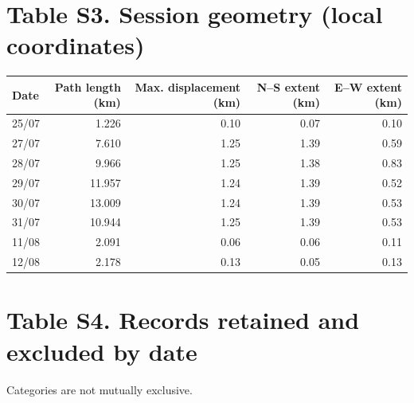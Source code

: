 \documentclass[10pt,a4paper]{article}
\begin{document}
\section*{Table S3. Session geometry (local coordinates)}
\begin{center}
\begin{tabular}{lrrrr}
\toprule
Date & Path length (km) & Max. displacement (km) & N--S extent (km) & E--W extent (km)\\
\midrule
25/07 & 1.226 & 0.10 & 0.07 & 0.10\\
27/07 & 7.610 & 1.25 & 1.39 & 0.59\\
28/07 & 9.966 & 1.25 & 1.38 & 0.83\\
29/07 & 11.957 & 1.24 & 1.39 & 0.52\\
30/07 & 13.009 & 1.24 & 1.39 & 0.53\\
31/07 & 10.944 & 1.25 & 1.39 & 0.53\\
11/08 & 2.091 & 0.06 & 0.06 & 0.11\\
12/08 & 2.178 & 0.13 & 0.05 & 0.13\\
\bottomrule
\end{tabular}
\end{center}

\section*{Table S4. Records retained and excluded by date}
\begin{center}
\end{center}
Categories are not mutually exclusive.
\end{document}
